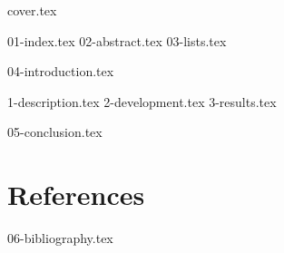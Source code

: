 \documentclass[12pt,a4paper,openany]{report}
\begin{document}
  {cover.tex}
  \clearpage

  {01-index.tex}
  \clearpage
  {02-abstract.tex}
  {03-lists.tex}

  {04-introduction.tex}
  \clearpage

  {1-description.tex}
  \clearpage
  {2-development.tex}
  \clearpage
  {3-results.tex}
  \clearpage

  {05-conclusion.tex}
  \clearpage

  \chapter*{References}
  {06-bibliography.tex}
  \clearpage
\end{document}
